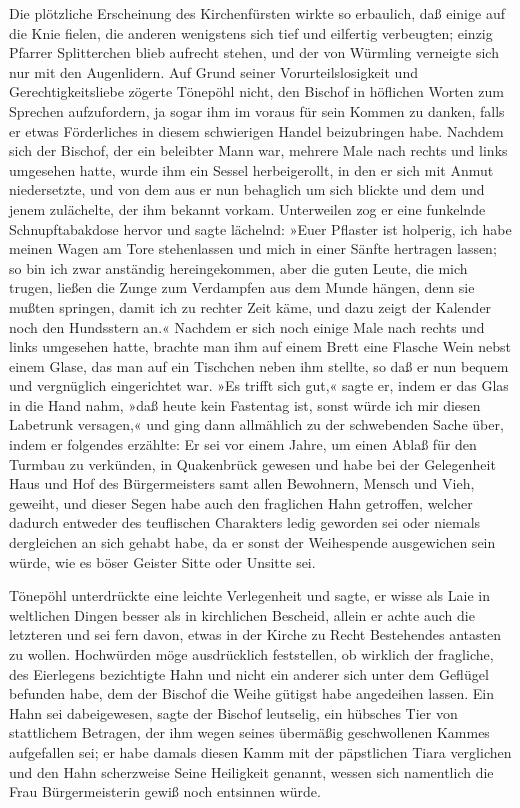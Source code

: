 Die plötzliche Erscheinung des Kirchenfürsten wirkte so erbaulich,
daß einige auf die Knie fielen, die anderen wenigstens sich tief
und eilfertig verbeugten; einzig Pfarrer Splitterchen blieb
aufrecht stehen, und der von Würmling verneigte sich nur mit den
Augenlidern. Auf Grund seiner Vorurteilslosigkeit und
Gerechtigkeitsliebe zögerte Tönepöhl nicht, den Bischof in
höflichen Worten zum Sprechen aufzufordern, ja sogar ihm im voraus
für sein Kommen zu danken, falls er etwas Förderliches in diesem
schwierigen Handel beizubringen habe. Nachdem sich der Bischof, der
ein beleibter Mann war, mehrere Male nach rechts und links
umgesehen hatte, wurde ihm ein Sessel herbeigerollt, in den er sich
mit Anmut niedersetzte, und von dem aus er nun behaglich um sich
blickte und dem und jenem zulächelte, der ihm bekannt vorkam.
Unterweilen zog er eine funkelnde Schnupftabakdose hervor und sagte
lächelnd: »Euer Pflaster ist holperig, ich habe meinen Wagen am
Tore stehenlassen und mich in einer Sänfte hertragen lassen; so bin
ich zwar anständig hereingekommen, aber die guten Leute, die mich
trugen, ließen die Zunge zum Verdampfen aus dem Munde hängen, denn
sie mußten springen, damit ich zu rechter Zeit käme, und dazu zeigt
der Kalender noch den Hundsstern an.« Nachdem er sich noch einige
Male nach rechts und links umgesehen hatte, brachte man ihm auf
einem Brett eine Flasche Wein nebst einem Glase, das man auf ein
Tischchen neben ihm stellte, so daß er nun bequem und vergnüglich
eingerichtet\pagenum{[39]} war. »Es trifft sich gut,« sagte er,
indem er das Glas in die Hand nahm, »daß heute kein Fastentag ist,
sonst würde ich mir diesen Labetrunk versagen,« und ging dann
allmählich zu der schwebenden Sache über, indem er folgendes
erzählte: Er sei vor einem Jahre, um einen Ablaß für den Turmbau zu
verkünden, in Quakenbrück gewesen und habe bei der Gelegenheit Haus
und Hof des Bürgermeisters samt allen Bewohnern, Mensch und Vieh,
geweiht, und dieser Segen habe auch den fraglichen Hahn getroffen,
welcher dadurch entweder des teuflischen Charakters ledig geworden
sei oder niemals dergleichen an sich gehabt habe, da er sonst der
Weihespende ausgewichen sein würde, wie es böser Geister Sitte oder
Unsitte sei.

Tönepöhl unterdrückte eine leichte Verlegenheit und sagte, er wisse
als Laie in weltlichen Dingen besser als in kirchlichen Bescheid,
allein er achte auch die letzteren und sei fern davon, etwas in der
Kirche zu Recht Bestehendes antasten zu wollen. Hochwürden möge
ausdrücklich feststellen, ob wirklich der fragliche, des Eierlegens
bezichtigte Hahn und nicht ein anderer sich unter dem Geflügel
befunden habe, dem der Bischof die Weihe gütigst habe angedeihen
lassen. Ein Hahn sei dabeigewesen, sagte der Bischof leutselig, ein
hübsches Tier von stattlichem Betragen, der ihm wegen seines
übermäßig geschwollenen Kammes aufgefallen sei; er habe damals
diesen Kamm mit der päpstlichen Tiara verglichen und den Hahn
scherzweise Seine Heiligkeit genannt, wessen sich namentlich die
Frau Bürgermeisterin gewiß noch entsinnen würde.

